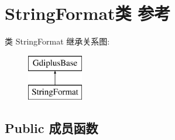 \hypertarget{class_string_format}{}\section{String\+Format类 参考}
\label{class_string_format}
类 String\+Format 继承关系图\+:\begin{figure}[H]
\begin{center}
\leavevmode
\includegraphics[height=2.000000cm]{class_string_format}
\end{center}
\end{figure}
\subsection*{Public 成员函数}
